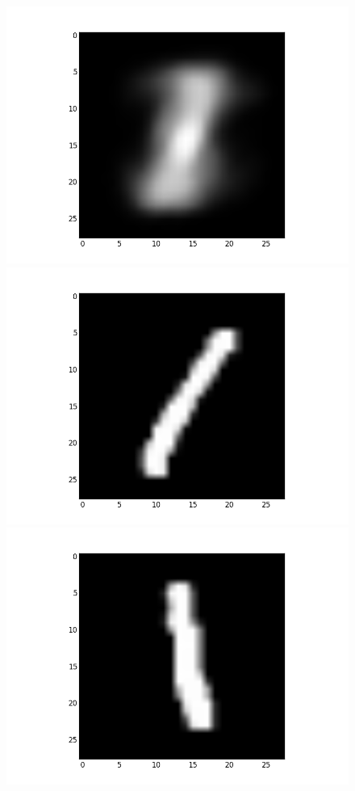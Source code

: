 \documentclass[submit]{harvardml}
\begin{document}
\begin{figure}[ht]
    \centering
    \includegraphics[scale=0.15]{K3-mean-2}
    \includegraphics[scale=0.15]{K3-representative-2-0}
    \includegraphics[scale=0.15]{K3-representative-2-1}

\end{figure}
\end{document}
